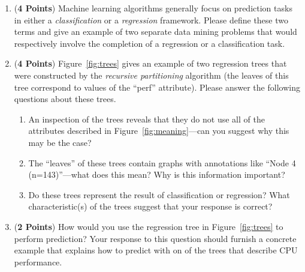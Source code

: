 \documentclass[12pt]{article}
\begin{document}
\begin{enumerate}
  \begin{enumerate}

  \item ({\bf 4 Points}) Machine learning algorithms generally focus on prediction tasks in either a {\em
    classification} or a {\em regression} framework.  Please define these two terms and give an example of two separate
    data mining problems that would respectively involve the completion of a regression or a classification task.


  \item ({\bf 4 Points}) Figure~\ref{fig:trees} gives an example of two regression trees that were constructed by the
    {\em recursive partitioning} algorithm (the leaves of this tree correspond to values of the ``perf'' attribute).
    Please answer the following questions about these trees.
    
    \begin{enumerate}
    
      \item An inspection of the trees reveals that they do not use all of the attributes described in
        Figure~\ref{fig:meaning}---can you suggest why this may be the case?

      \item The ``leaves'' of these trees contain graphs with annotations like ``Node 4 (n=143)''---what does this mean?
        Why is this information important?

      \item Do these trees represent the result of classification or regression? What characteristic(s) of the trees
        suggest that your response is correct?

    \end{enumerate}

  \item ({\bf 2 Points}) How would you use the regression tree in Figure~\ref{fig:trees} to perform prediction?  Your
    response to this question should furnish a concrete example that explains how to predict with on of the trees that
    describe CPU performance.


\end{enumerate}
\end{enumerate}
\end{document}
